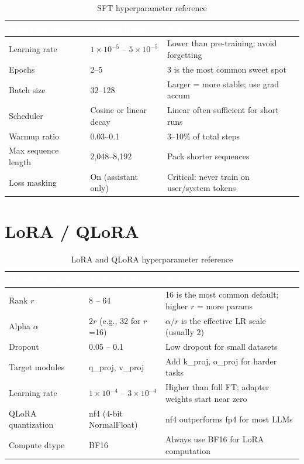\begin{table}[H]
\centering\small\sffamily
{}
\begin{tabular}{L{3.5cm}L{3cm}L{5cm}}
\toprule
{}\textcolor{white}{\textbf{Hyperparameter}} & \textcolor{white}{\textbf{Typical Range}} & \textcolor{white}{\textbf{Notes}} \\
\midrule
Learning rate & $1\times10^{-5}$ -- $5\times10^{-5}$ & Lower than pre-training; avoid forgetting \\
Epochs & 2--5 & 3 is the most common sweet spot \\
Batch size & 32--128 & Larger = more stable; use grad accum \\
Scheduler & Cosine or linear decay & Linear often sufficient for short runs \\
Warmup ratio & 0.03--0.1 & 3--10\% of total steps \\
Max sequence length & 2,048--8,192 & Pack shorter sequences \\
Loss masking & On (assistant only) & Critical: never train on user/system tokens \\
\bottomrule
\end{tabular}
\caption{SFT hyperparameter reference}
\end{table}

\section{LoRA / QLoRA}

\begin{table}[H]
\centering\small\sffamily
{}
\begin{tabular}{L{3.5cm}L{3cm}L{5cm}}
\toprule
{}\textcolor{white}{\textbf{Hyperparameter}} & \textcolor{white}{\textbf{Typical Value}} & \textcolor{white}{\textbf{Notes}} \\
\midrule
Rank $r$ & 8 -- 64 & 16 is the most common default; higher $r$ = more params \\
Alpha $\alpha$ & $2r$ (e.g., 32 for $r$=16) & $\alpha/r$ is the effective LR scale (usually 2) \\
Dropout & 0.05 -- 0.1 & Low dropout for small datasets \\
Target modules & q\_proj, v\_proj & Add k\_proj, o\_proj for harder tasks \\
Learning rate & $1\times10^{-4}$ -- $3\times10^{-4}$ & Higher than full FT; adapter weights start near zero \\
QLoRA quantization & nf4 (4-bit NormalFloat) & nf4 outperforms fp4 for most LLMs \\
Compute dtype & BF16 & Always use BF16 for LoRA computation \\
\bottomrule
\end{tabular}
\caption{LoRA and QLoRA hyperparameter reference}
\end{table}


